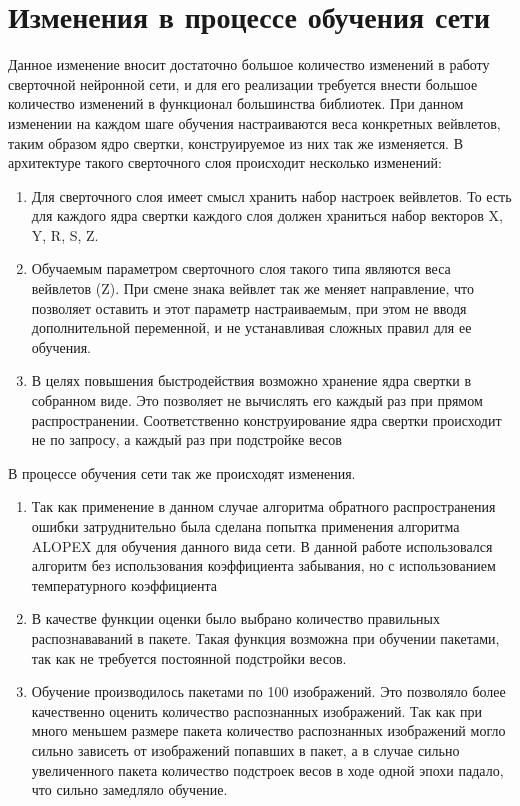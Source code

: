 \documentclass[utf8,usehyperref,14pt]{G7-32}
\begin{document}
\section{Изменения в процессе обучения сети}
Данное изменение вносит достаточно большое количество изменений в работу сверточной нейронной сети, и для его реализации требуется внести большое количество изменений в функционал большинства библиотек.  При данном изменении на каждом шаге обучения настраиваются веса конкретных вейвлетов, таким образом ядро свертки, конструируемое из них так же изменяется.
В архитектуре такого сверточного слоя происходит несколько изменений:
\begin{enumerate}
\item Для сверточного слоя имеет смысл хранить набор настроек вейвлетов. То есть для каждого ядра свертки каждого слоя должен храниться набор векторов {X, Y, R, S, Z}.
\item Обучаемым параметром сверточного слоя такого типа являются веса вейвлетов (Z). При смене знака вейвлет так же меняет направление, что позволяет оставить и этот параметр настраиваемым, при этом не вводя дополнительной переменной, и не устанавливая сложных правил для ее обучения.
\item В целях повышения быстродействия возможно хранение ядра свертки в собранном виде. Это позволяет не вычислять его каждый раз при прямом распространении. Соответственно конструирование ядра свертки происходит не по запросу, а каждый раз при подстройке весов
\end{enumerate}

В процессе обучения сети так же происходят изменения.
\begin{enumerate}
\item Так как применение в данном случае алгоритма обратного распространения ошибки затруднительно была сделана попытка применения алгоритма ALOPEX для обучения данного вида сети. В данной работе использовался алгоритм без использования коэффициента забывания, но с использованием температурного коэффициента 
\item В качестве функции оценки было выбрано количество правильных распознававаний  в пакете. Такая функция возможна при обучении пакетами, так как не требуется постоянной подстройки весов.
\item Обучение производилось пакетами по 100 изображений. Это позволяло более качественно оценить количество распознанных изображений. Так как при много меньшем размере пакета количество распознанных изображений могло сильно зависеть от изображений попавших в пакет, а в случае сильно увеличенного пакета количество подстроек весов в ходе одной эпохи падало, что сильно замедляло обучение.
\end{enumerate}
\end{document}

